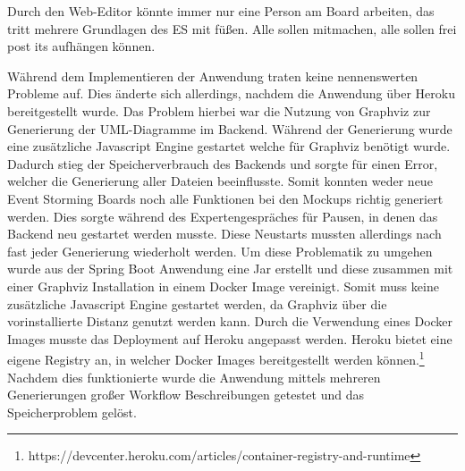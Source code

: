 Durch den Web-Editor könnte immer nur eine Person am Board arbeiten, das tritt mehrere Grundlagen des ES mit füßen.
Alle sollen mitmachen, alle sollen frei post its aufhängen können.


Während dem Implementieren der Anwendung traten keine nennenswerten Probleme auf.
Dies änderte sich allerdings, nachdem die Anwendung über Heroku bereitgestellt wurde.
Das Problem hierbei war die Nutzung von Graphviz zur Generierung der UML-Diagramme im Backend.
Während der Generierung wurde eine zusätzliche Javascript Engine gestartet welche für Graphviz benötigt wurde.
Dadurch stieg der Speicherverbrauch des Backends und sorgte für einen Error, welcher die Generierung aller Dateien beeinflusste.
Somit konnten weder neue Event Storming Boards noch alle Funktionen bei den Mockups richtig generiert werden.
Dies sorgte während des Expertengespräches für Pausen, in denen das Backend neu gestartet werden musste.
Diese Neustarts mussten allerdings nach fast jeder Generierung wiederholt werden.
Um diese Problematik zu umgehen wurde aus der Spring Boot Anwendung eine Jar erstellt und diese zusammen mit einer Graphviz Installation in einem Docker Image
vereinigt.\cite*{size-problem}
Somit muss keine zusätzliche Javascript Engine gestartet werden, da Graphviz über die vorinstallierte Distanz genutzt werden kann.
Durch die Verwendung eines Docker Images musste das Deployment auf Heroku angepasst werden.
Heroku bietet eine eigene Registry an, in welcher Docker Images bereitgestellt werden können.\footnote{https://devcenter.heroku.com/articles/container-registry-and-runtime}
Nachdem dies funktionierte wurde die Anwendung mittels mehreren Generierungen großer Workflow Beschreibungen getestet und das Speicherproblem gelöst.
